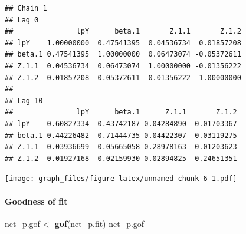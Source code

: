 \documentclass[]{article}
\newenvironment{Shaded}{\begin{snugshade}}{\end{snugshade}}
\newcommand{\KeywordTok}[1]{\textcolor[rgb]{0.13,0.29,0.53}{\textbf{#1}}}
\newcommand{\NormalTok}[1]{#1}
\newcommand{\StringTok}[1]{\textcolor[rgb]{0.31,0.60,0.02}{#1}}
\let\oldparagraph\paragraph
\renewcommand{\paragraph}[1]{\oldparagraph{#1}\mbox{}}
\begin{document}
\begin{verbatim}
## Chain 1 
## Lag 0 
##               lpY      beta.1       Z.1.1       Z.1.2
## lpY    1.00000000  0.47541395  0.04536734  0.01857208
## beta.1 0.47541395  1.00000000  0.06473074 -0.05372611
## Z.1.1  0.04536734  0.06473074  1.00000000 -0.01356222
## Z.1.2  0.01857208 -0.05372611 -0.01356222  1.00000000
## 
## Lag 10 
##               lpY      beta.1      Z.1.1       Z.1.2
## lpY    0.60827334  0.43742187 0.04284890  0.01703367
## beta.1 0.44226482  0.71444735 0.04422307 -0.03119275
## Z.1.1  0.03936699  0.05665058 0.28978163  0.01203623
## Z.1.2  0.01927168 -0.02159930 0.02894825  0.24651351
\end{verbatim}

\texttt{[image: graph\_files/figure-latex/unnamed-chunk-6-1.pdf]}

\hypertarget{goodness-of-fit}{%
\paragraph{Goodness of fit}\label{goodness-of-fit}}

\begin{Shaded}
\begin{Highlighting}[]
\NormalTok{net_p.gof <-}\StringTok{ }\KeywordTok{gof}\NormalTok{(net_p.fit)}
\NormalTok{net_p.gof}
\end{Highlighting}
\end{Shaded}
\end{document}
